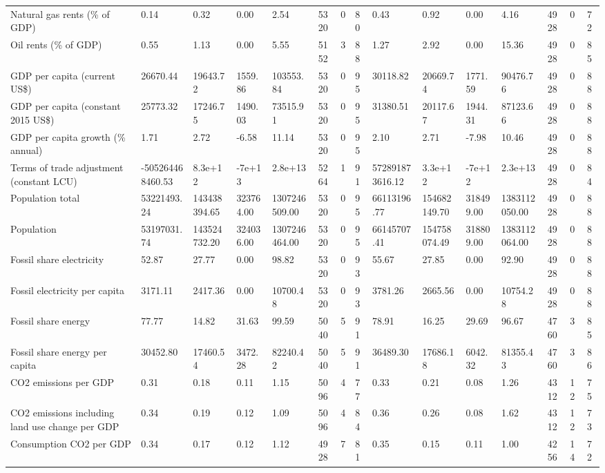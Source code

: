 \begin{longtable}{lllllllllllllll}
\addlinespace
Natural gas rents (\% of GDP) & 0.14 & 0.32 & 0.00 & 2.54 & 5320 & 0 & 80 & 0.43 & 0.92 & 0.00 & 4.16 & 4928 & 0 & 72\\
Oil rents (\% of GDP) & 0.55 & 1.13 & 0.00 & 5.55 & 5152 & 3 & 88 & 1.27 & 2.92 & 0.00 & 15.36 & 4928 & 0 & 85\\
GDP per capita (current US\$) & 26670.44 & 19643.72 & 1559.86 & 103553.84 & 5320 & 0 & 95 & 30118.82 & 20669.74 & 1771.59 & 90476.76 & 4928 & 0 & 88\\
GDP per capita (constant 2015 US\$) & 25773.32 & 17246.75 & 1490.03 & 73515.91 & 5320 & 0 & 95 & 31380.51 & 20117.67 & 1944.31 & 87123.66 & 4928 & 0 & 88\\
GDP per capita growth (\% annual) & 1.71 & 2.72 & -6.58 & 11.14 & 5320 & 0 & 95 & 2.10 & 2.71 & -7.98 & 10.46 & 4928 & 0 & 88\\
\addlinespace
Terms of trade adjustment (constant LCU) & -505264468460.53 & 8.3e+12 & -7e+13 & 2.8e+13 & 5264 & 1 & 91 & 572891873616.12 & 3.3e+12 & -7e+12 & 2.3e+13 & 4928 & 0 & 84\\
Population total & 53221493.24 & 143438394.65 & 323764.00 & 1307246509.00 & 5320 & 0 & 95 & 66113196.77 & 154682149.70 & 318499.00 & 1383112050.00 & 4928 & 0 & 88\\
Population & 53197031.74 & 143524732.20 & 324036.00 & 1307246464.00 & 5320 & 0 & 95 & 66145707.41 & 154758074.49 & 318809.00 & 1383112064.00 & 4928 & 0 & 88\\
Fossil share electricity & 52.87 & 27.77 & 0.00 & 98.82 & 5320 & 0 & 93 & 55.67 & 27.85 & 0.00 & 92.90 & 4928 & 0 & 88\\
Fossil electricity per capita & 3171.11 & 2417.36 & 0.00 & 10700.48 & 5320 & 0 & 93 & 3781.26 & 2665.56 & 0.00 & 10754.28 & 4928 & 0 & 88\\
\addlinespace
Fossil share energy & 77.77 & 14.82 & 31.63 & 99.59 & 5040 & 5 & 91 & 78.91 & 16.25 & 29.69 & 96.67 & 4760 & 3 & 85\\
Fossil share energy per capita & 30452.80 & 17460.54 & 3472.28 & 82240.42 & 5040 & 5 & 91 & 36489.30 & 17686.18 & 6042.32 & 81355.43 & 4760 & 3 & 86\\
CO2 emissions per GDP & 0.31 & 0.18 & 0.11 & 1.15 & 5096 & 4 & 77 & 0.33 & 0.21 & 0.08 & 1.26 & 4312 & 12 & 75\\
CO2 emissions including land use change per GDP & 0.34 & 0.19 & 0.12 & 1.09 & 5096 & 4 & 84 & 0.36 & 0.26 & 0.08 & 1.62 & 4312 & 12 & 73\\
Consumption CO2 per GDP & 0.34 & 0.17 & 0.12 & 1.12 & 4928 & 7 & 81 & 0.35 & 0.15 & 0.11 & 1.00 & 4256 & 14 & 72\\

\end{longtable}
